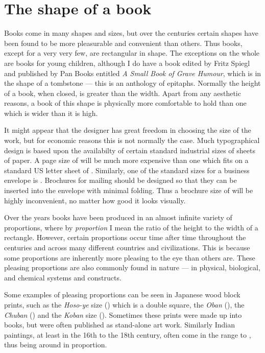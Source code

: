 \section{The shape of a book}

    Books come in many shapes and sizes, but over the centuries certain
shapes have been found to be more pleasurable and convenient than others.
Thus books, except for a very very few, are rectangular in shape. The 
exceptions on the whole are books for young children, although I do
have a book edited by Fritz Spiegl and published by Pan Books entitled
\textit{A Small Book of Grave Humour}, which is in the shape of a tombstone
--- this is an anthology of epitaphs. Normally the height of a book, when 
closed, is greater than the width. Apart from any aesthetic reasons, 
a book of this shape is physically more comfortable to hold than one which 
is wider than it is high.

    It might appear that the designer has great freedom in choosing the
size of the work, but for economic reasons this is not normally the case.
Much typographical design is based upon the availabilty of certain 
standard industrial sizes of sheets of paper. 
A page size of  will be much more expensive than one 
which fits on a standard
US letter sheet 
of . 
Similarly, one of the standard sizes
for a business envelope is . 
Brochures for mailing
should be designed so that they can be inserted into the envelope with 
minimal folding. Thus a brochure size of  will be 
highly inconvenient, no matter how good it looks visually.

    Over the years books have been produced in an almost infinite variety
of proportions,
where by \emph{proportion}
I mean the ratio of the height to the width of a
rectangle. However, certain proportions occur time after time throughout
the centuries and across many different countries and 
civilizations. This is because some proportions are inherently
more pleasing to the eye than others are. These pleasing proportions are
also commonly found in nature --- in  physical, biological, and chemical
systems and constructs. 


    Some examples of pleasing proportions can be
seen in Japanese wood block prints, such as the \textit{Hoso-ye} size
() which is a double square, the \textit{Oban} (), %
the \textit{Chuban} () and the \textit{Koban} size
(). Sometimes these prints were made up into books, but
were often published as stand-alone art work. Similarly Indian paintings,
at least in the 16th to the 18th century,
often come in the range  to , thus being around
 in proportion.


